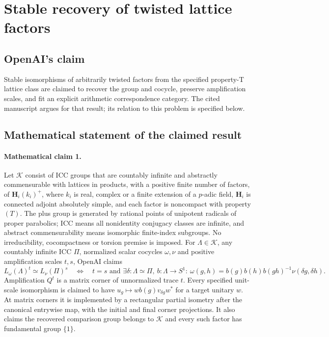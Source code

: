 \documentclass[11pt]{article}
\begin{document}
\section*{Stable recovery of twisted lattice factors}

\subsection{OpenAI's claim}
Stable isomorphisms of arbitrarily twisted factors from the specified property-T lattice class are claimed to recover the group and cocycle, preserve amplification scales, and fit an explicit arithmetic correspondence category. The cited manuscript argues for that result; its relation to this problem is specified below.

\subsection{Mathematical statement of the claimed result}
\paragraph{Mathematical claim 1.} Let $\mathscr K$ consist of ICC groups that are countably infinite and abstractly commensurable with lattices in products, with a positive finite number of factors, of $\mathbf H_i(k_i)^+$, where $k_i$ is real, complex or a finite extension of a $p$-adic field, $\mathbf H_i$ is connected adjoint absolutely simple, and each factor is noncompact with property $(T)$. The plus group is generated by rational points of unipotent radicals of proper parabolics; ICC means all nonidentity conjugacy classes are infinite, and abstract commensurability means isomorphic finite-index subgroups. No irreducibility, cocompactness or torsion premise is imposed. For $\Lambda\in\mathscr K$, any countably infinite ICC $\Pi$, normalized scalar cocycles $\omega,\nu$ and positive amplification scales $t,s$, OpenAI claims
\[
L_\omega(\Lambda)^t\simeq L_\nu(\Pi)^s\quad\Longleftrightarrow\quad
 t=s\text{ and }\exists\delta:\Lambda\simeq\Pi,\ b:\Lambda\to S^1:\
\omega(g,h)=b(g)b(h)b(gh)^{-1}\nu(\delta g,\delta h).
\]
Amplification $Q^t$ is a matrix corner of unnormalized trace $t$. Every specified unit-scale isomorphism is claimed to have $u_g\mapsto wb(g)v_{\delta g}w^*$ for a target unitary $w$. At matrix corners it is implemented by a rectangular partial isometry after the canonical entrywise map, with the initial and final corner projections. It also claims the recovered comparison group belongs to $\mathscr K$ and every such factor has fundamental group $\{1\}$.
\end{document}
